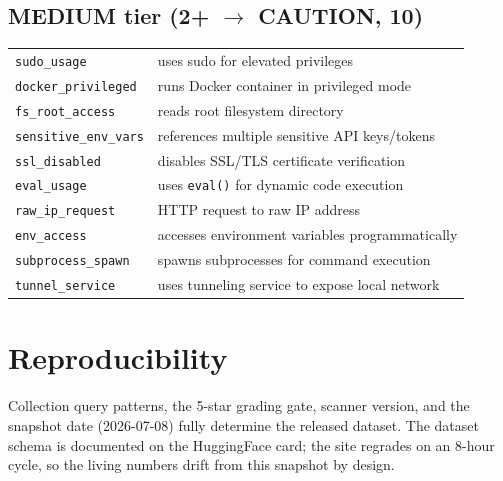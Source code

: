 \documentclass[11pt]{article}
\begin{document}
\subsection*{MEDIUM tier (2+ $\rightarrow$ CAUTION, 10)}
\small
\begin{tabular}{lp{9cm}}
\texttt{sudo\_usage} & uses sudo for elevated privileges \\
\texttt{docker\_privileged} & runs Docker container in privileged mode \\
\texttt{fs\_root\_access} & reads root filesystem directory \\
\texttt{sensitive\_env\_vars} & references multiple sensitive API keys/tokens \\
\texttt{ssl\_disabled} & disables SSL/TLS certificate verification \\
\texttt{eval\_usage} & uses \texttt{eval()} for dynamic code execution \\
\texttt{raw\_ip\_request} & HTTP request to raw IP address \\
\texttt{env\_access} & accesses environment variables programmatically \\
\texttt{subprocess\_spawn} & spawns subprocesses for command execution \\
\texttt{tunnel\_service} & uses tunneling service to expose local network \\
\end{tabular}

\section{Reproducibility}

Collection query patterns, the 5-star grading gate, scanner version, and the
snapshot date (2026-07-08) fully determine the released dataset. The dataset
schema is documented on the HuggingFace card; the site regrades on an 8-hour
cycle, so the living numbers drift from this snapshot by design.
\end{document}
